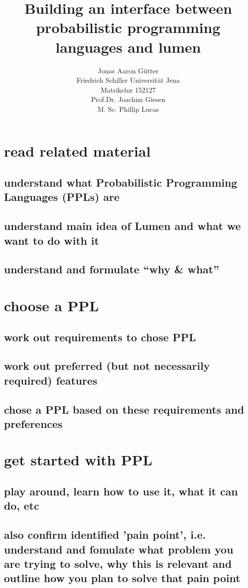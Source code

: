 \documentclass{article}
\title{Building an interface between probabilistic programming languages and lumen}
\author{Jonas Aaron Gütter  \\
	Friedrich Schiller Universität Jena  \\
    Matrikelnr 152127 \\
    Prof.Dr. Joachim Giesen \\
    M. Sc. Phillip Lucas
	}
\begin{document}
\maketitle

\section{read related material}
        \subsection{understand what Probabilistic Programming Languages (PPLs) are}
        \subsection{understand main idea of Lumen and what we want to do with it}
        \subsection{understand and formulate “why \& what”}
\section{choose a PPL}
        \subsection{work out requirements to chose PPL}
        \subsection{work out preferred (but not necessarily required) features}
        \subsection{chose a PPL based on these requirements and preferences}
\section{get started with PPL}
        \subsection{play around, learn how to use it, what it can do, etc}
        \subsection{also confirm identified 'pain point', i.e. understand and fomulate what problem you are trying to solve, why this is relevant and outline how you plan to solve that pain point}
\end{document}
